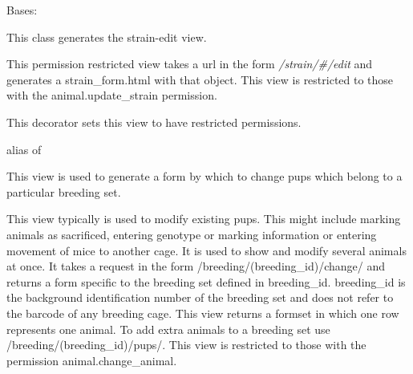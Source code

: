 \documentclass[letterpaper,10pt,english]{sphinxmanual}
\begin{document}
\begin{fulllineitems}
\label{api:mousedb.animal.views.StrainUpdate}
Bases: 

This class generates the strain-edit view.

This permission restricted view takes a url in the form \emph{/strain/\#/edit} and generates a strain\_form.html with that object.
This view is restricted to those with the animal.update\_strain permission.


\begin{fulllineitems}
\label{api:mousedb.animal.views.StrainUpdate.dispatch}
This decorator sets this view to have restricted permissions.

\end{fulllineitems}



\begin{fulllineitems}
\label{api:mousedb.animal.views.StrainUpdate.model}
alias of 

\end{fulllineitems}


\end{fulllineitems}



\begin{fulllineitems}
\label{api:mousedb.animal.views.breeding_change}
This view is used to generate a form by which to change pups which belong to a particular breeding set.

This view typically is used to modify existing pups.  This might include marking animals as sacrificed, entering genotype or marking information or entering movement of mice to another cage.  It is used to show and modify several animals at once.
It takes a request in the form /breeding/(breeding\_id)/change/ and returns a form specific to the breeding set defined in breeding\_id.  breeding\_id is the background identification number of the breeding set and does not refer to the barcode of any breeding cage.
This view returns a formset in which one row represents one animal.  To add extra animals to a breeding set use /breeding/(breeding\_id)/pups/.
This view is restricted to those with the permission animal.change\_animal.

\end{fulllineitems}
\end{document}
